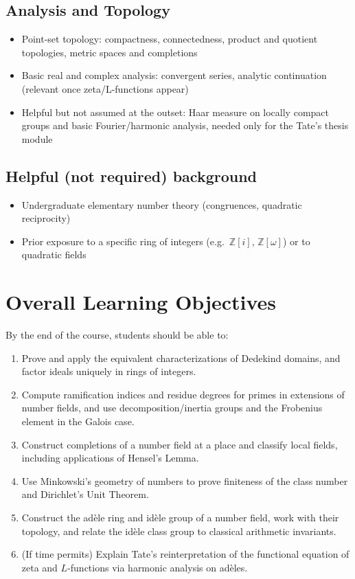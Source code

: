 \documentclass[11pt]{article}
\newcommand{\Z}{\mathbb{Z}}
\begin{document}
\subsection{Analysis and Topology}
\begin{itemize}[leftmargin=*]
  \item Point-set topology: compactness, connectedness, product and quotient topologies, metric spaces and completions
  \item Basic real and complex analysis: convergent series, analytic continuation (relevant once zeta/L-functions appear)
  \item Helpful but not assumed at the outset: Haar measure on locally compact groups and basic Fourier/harmonic analysis, needed only for the Tate's thesis module
\end{itemize}

\subsection{Helpful (not required) background}
\begin{itemize}[leftmargin=*]
  \item Undergraduate elementary number theory (congruences, quadratic reciprocity)
  \item Prior exposure to a specific ring of integers (e.g.\ $\Z[i]$, $\Z[\omega]$) or to quadratic fields
\end{itemize}

\section{Overall Learning Objectives}
By the end of the course, students should be able to:
\begin{enumerate}[leftmargin=*]
  \item Prove and apply the equivalent characterizations of Dedekind domains, and factor ideals uniquely in rings of integers.
  \item Compute ramification indices and residue degrees for primes in extensions of number fields, and use decomposition/inertia groups and the Frobenius element in the Galois case.
  \item Construct completions of a number field at a place and classify local fields, including applications of Hensel's Lemma.
  \item Use Minkowski's geometry of numbers to prove finiteness of the class number and Dirichlet's Unit Theorem.
  \item Construct the adèle ring and idèle group of a number field, work with their topology, and relate the idèle class group to classical arithmetic invariants.
  \item (If time permits) Explain Tate's reinterpretation of the functional equation of zeta and $L$-functions via harmonic analysis on adèles.
\end{enumerate}
\end{document}
